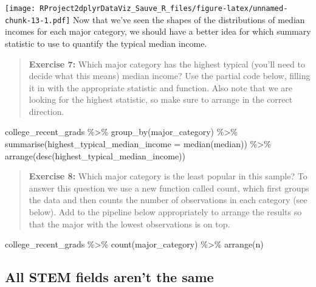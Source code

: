 \documentclass[
]{article}
\newenvironment{Shaded}{\begin{snugshade}}{\end{snugshade}}
\newcommand{\AttributeTok}[1]{\textcolor[rgb]{0.77,0.63,0.00}{#1}}
\newcommand{\FunctionTok}[1]{\textcolor[rgb]{0.00,0.00,0.00}{#1}}
\newcommand{\NormalTok}[1]{#1}
\newcommand{\SpecialCharTok}[1]{\textcolor[rgb]{0.00,0.00,0.00}{#1}}
\begin{document}
\texttt{[image: RProject2dplyrDataViz\_Sauve\_R\_files/figure-latex/unnamed-chunk-13-1.pdf]}
Now that we've seen the shapes of the distributions of median incomes
for each major category, we should have a better idea for which summary
statistic to use to quantify the typical median income.

\begin{quote}
\textbf{Exercise 7:} Which major category has the highest typical
(you'll need to decide what this means) median income? Use the partial
code below, filling it in with the appropriate statistic and function.
Also note that we are looking for the highest statistic, so make sure to
arrange in the correct direction.
\end{quote}

\begin{Shaded}
\begin{Highlighting}[]
\NormalTok{college\_recent\_grads }\SpecialCharTok{\%\textgreater{}\%}
  \FunctionTok{group\_by}\NormalTok{(major\_category) }\SpecialCharTok{\%\textgreater{}\%}
  \FunctionTok{summarise}\NormalTok{(}\AttributeTok{highest\_typical\_median\_income =} \FunctionTok{median}\NormalTok{(median)) }\SpecialCharTok{\%\textgreater{}\%}
  \FunctionTok{arrange}\NormalTok{(}\FunctionTok{desc}\NormalTok{(highest\_typical\_median\_income))}
\end{Highlighting}
\end{Shaded}

\begin{quote}
\textbf{Exercise 8:} Which major category is the least popular in this
sample? To answer this question we use a new function called count,
which first groups the data and then counts the number of observations
in each category (see below). Add to the pipeline below appropriately to
arrange the results so that the major with the lowest observations is on
top.
\end{quote}

\begin{Shaded}
\begin{Highlighting}[]
\NormalTok{college\_recent\_grads }\SpecialCharTok{\%\textgreater{}\%}
  \FunctionTok{count}\NormalTok{(major\_category) }\SpecialCharTok{\%\textgreater{}\%}
  \FunctionTok{arrange}\NormalTok{(n)}
\end{Highlighting}
\end{Shaded}

\hypertarget{all-stem-fields-arent-the-same}{%
\subsection{All STEM fields aren't the
same}\label{all-stem-fields-arent-the-same}}
\end{document}
